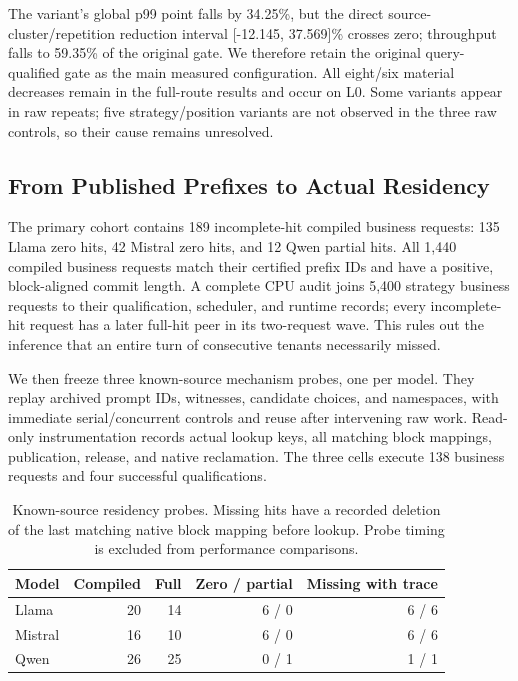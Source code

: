 The variant's global p99 point falls by 34.25\%, but the direct source-cluster/repetition reduction interval [-12.145, 37.569]\% crosses zero; throughput falls to 59.35\% of the original gate. We therefore retain the original query-qualified gate as the main measured configuration. All eight/six material decreases remain in the full-route results and occur on L0. Some variants appear in raw repeats; five strategy/position variants are not observed in the three raw controls, so their cause remains unresolved.

\subsection{From Published Prefixes to Actual Residency}
\label{sec:residency}
The primary cohort contains 189 incomplete-hit compiled business requests: 135 Llama zero hits, 42 Mistral zero hits, and 12 Qwen partial hits. All 1,440 compiled business requests match their certified prefix IDs and have a positive, block-aligned commit length. A complete CPU audit joins 5,400 strategy business requests to their qualification, scheduler, and runtime records; every incomplete-hit request has a later full-hit peer in its two-request wave. This rules out the inference that an entire turn of consecutive tenants necessarily missed.

We then freeze three known-source mechanism probes, one per model. They replay archived prompt IDs, witnesses, candidate choices, and namespaces, with immediate serial/concurrent controls and reuse after intervening raw work. Read-only instrumentation records actual lookup keys, all matching block mappings, publication, release, and native reclamation. The three cells execute 138 business requests and four successful qualifications.

\begin{table}[t]
\centering\small
\caption{Known-source residency probes. Missing hits have a recorded deletion of the last matching native block mapping before lookup. Probe timing is excluded from performance comparisons.}
\label{tab:residency}
\begin{tabular}{@{}lrrrr@{}}
\toprule
Model & Compiled & Full & Zero / partial & Missing with trace\\
\midrule
Llama & 20 & 14 & 6 / 0 & 6 / 6\\
Mistral & 16 & 10 & 6 / 0 & 6 / 6\\
Qwen & 26 & 25 & 0 / 1 & 1 / 1\\
\bottomrule
\end{tabular}
\end{table}

